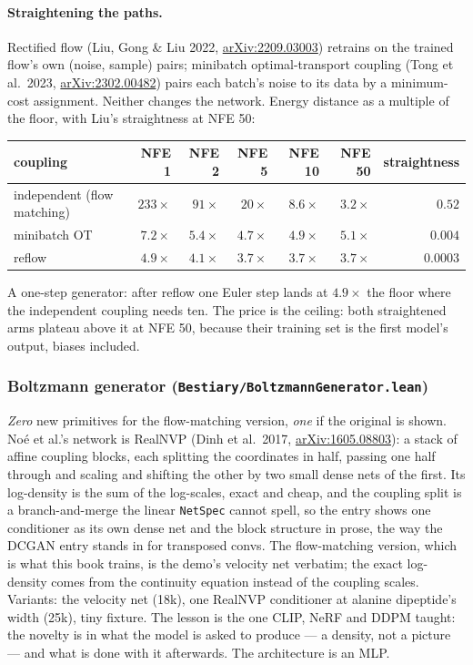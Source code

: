 \paragraph{Straightening the paths.} Rectified flow (Liu, Gong \& Liu 2022,
\href{https://arxiv.org/abs/2209.03003}{arXiv:2209.03003}) retrains on the
trained flow's own (noise, sample) pairs; minibatch optimal-transport
coupling (Tong et al.\ 2023,
\href{https://arxiv.org/abs/2302.00482}{arXiv:2302.00482}) pairs each batch's
noise to its data by a minimum-cost assignment. Neither changes the network.
Energy distance as a multiple of the floor, with Liu's straightness at NFE 50:

\begin{center}
\small
\begin{tabular}{@{}l r r r r r r@{}}
\hline
coupling & NFE 1 & NFE 2 & NFE 5 & NFE 10 & NFE 50 & straightness \\
\hline
independent (flow matching) & $233\times$ & $91\times$ & $20\times$ & $8.6\times$ & $\mathbf{3.2\times}$ & $0.52$ \\
minibatch OT                & $7.2\times$ & $5.4\times$ & $4.7\times$ & $4.9\times$ & $5.1\times$ & $0.004$ \\
reflow                      & $\mathbf{4.9\times}$ & $\mathbf{4.1\times}$ & $\mathbf{3.7\times}$ & $\mathbf{3.7\times}$ & $3.7\times$ & $0.0003$ \\
\hline
\end{tabular}
\end{center}

\noindent A one-step generator: after reflow one Euler step lands at
$4.9\times$ the floor where the independent coupling needs ten. The price is
the ceiling: both straightened arms plateau above it at NFE 50, because their
training set is the first model's output, biases included.

\subsubsection*{Boltzmann generator (\texttt{Bestiary/BoltzmannGenerator.lean})}
\emph{Zero} new primitives for the flow-matching version, \emph{one} if the
original is shown. No\'e et al.'s network is RealNVP (Dinh et al.\ 2017,
\href{https://arxiv.org/abs/1605.08803}{arXiv:1605.08803}): a stack of affine
coupling blocks, each splitting the coordinates in half, passing one half
through and scaling and shifting the other by two small dense nets of the
first. Its log-density is the sum of the log-scales, exact and cheap, and
the coupling split is a branch-and-merge the linear \texttt{NetSpec} cannot
spell, so the entry shows one conditioner as its own dense net and the block
structure in prose, the way the DCGAN entry stands in for transposed convs.
The flow-matching version, which is what this book trains, is the demo's
velocity net verbatim; the exact log-density comes from the continuity
equation instead of the coupling scales. Variants: the velocity net (18k),
one RealNVP conditioner at alanine dipeptide's width (25k), tiny fixture.
The lesson is the one CLIP, NeRF and DDPM taught: the novelty is in what
the model is asked to produce --- a density, not a picture --- and what is
done with it afterwards. The architecture is an MLP.

